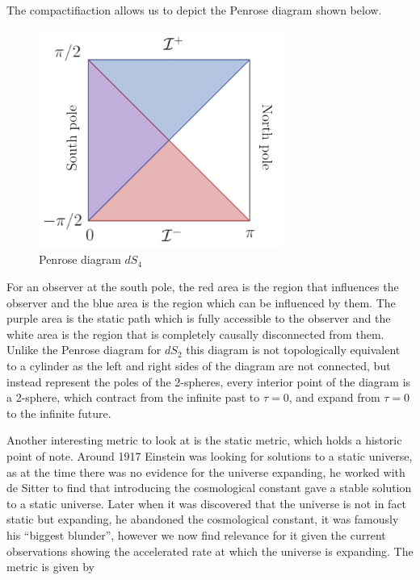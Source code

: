 \documentclass[a4paper,11pt]{article}
\numberwithin{equation}{section}
\numberwithin{figure}{section}
\begin{document}
\begin{large}
\vspace{0.5cm}

The compactifiaction allows us to depict the Penrose diagram shown below.

\begin{figure}[h]
    \centering
    \includegraphics[width=8cm]{Penrose_dS4.PNG}
    \caption{Penrose diagram $dS_4$}
    \label{fig:penrose_dS4}
    
\end{figure}

For an observer at the south pole, the red area is the region that influences the observer and the blue area is the region which can be influenced by them. The purple area is the static path which is fully accessible to the observer and the white area is the region that is completely causally disconnected from them. Unlike the Penrose diagram for $dS_2$ this diagram is not topologically equivalent to a cylinder as the left and right sides of the diagram are not connected, but instead represent the poles of the 2-spheres, every interior point of the diagram is a 2-sphere, which contract from the infinite past to $\tau=0$, and expand from $\tau=0$ to the infinite future.



Another interesting metric to look at is the static metric, which holds a historic point of note. Around 1917 Einstein was looking for solutions to a static universe, as at the time there was no evidence for the universe expanding, he worked with de Sitter to find that introducing the cosmological constant gave a stable solution to a static universe. Later when it was discovered that the universe is not in fact static but expanding, he abandoned the cosmological constant, it was famously his ``biggest blunder'', however we now find relevance for it given the current observations showing the accelerated rate at which the universe is expanding. The metric is given by


\end{large}
\end{document}
